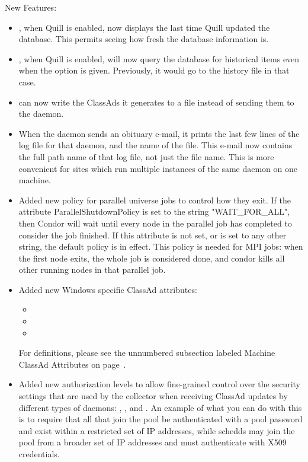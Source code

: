 \noindent New Features:

\begin{itemize}

\item {}, when Quill is enabled, now displays the last time
Quill updated the database.  This permits seeing how fresh
the database information is.

\item {}, when Quill is enabled, will now query the
database for historical items even when the  option
is given.  Previously, it would go to the history file in that case.

\item {} can now write the ClassAds it generates to a
file instead of sending them to the  daemon.

\item When the  daemon sends an obituary e-mail,
it prints the last few lines of the log file for that daemon,
and the name of the file.
This e-mail now contains the full path name of that log file,
not just the file name.  This is more convenient for sites which
run multiple instances of the same daemon on one machine.

\item Added new policy for parallel universe jobs to control how they
exit.  If the attribute ParallelShutdownPolicy is set to the string
"WAIT\_FOR\_ALL", then Condor will wait until every node in the parallel
job has completed to consider the job finished.  If this attribute is
not set, or is set to any other string, the default policy is in effect.
This policy is needed for MPI jobs: when the first node exits, the whole
job is considered done, and condor kills all other running nodes in that
parallel job.

\item Added new Windows specific ClassAd attributes:
 \begin{itemize}
 \item {}
 \item {}
 \item {}
 \end{itemize}
For definitions, please see 
the unnumbered subsection labeled Machine ClassAd Attributes
on page~\pageref{sec:Machine-ClassAd-Attributes}.

\item Added new authorization levels to allow fine-grained control
over the security settings that are used by the collector when
receiving ClassAd updates by different types of daemons:
, , and
.  An example of what you can do with this
is to require that all  that join the pool be
authenticated with a pool password and exist within a restricted set
of IP addresses, while schedds may join the pool from a broader set
of IP addresses and must authenticate with X509 credentials.


\end{itemize}

